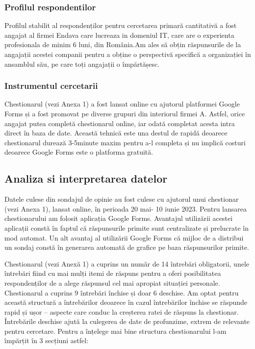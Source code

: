 \documentclass[a4paper, 12pt]{article}
\begin{document}
		\subsubsection{Profilul respondentilor}
	\quad Profilul stabilit al respondenților pentru cercetarea primară cantitativă a fost angajat al firmei Endava care lucreaza in domeniul IT, care are  o experienta profesionala de minim 6 luni, din România.Am ales să obțin răspunsurile de la angajații acestei companii pentru a obține o perspectivă specifică a organizației în ansamblul său, pe care toți angajații o împărtășesc.
		
	\subsubsection{Instrumentul cercetarii}

	\quad Chestionarul (vezi Anexa 1) a fost lansat online cu ajutorul platformei Google Forms și a fost promovat  pe diverse grupuri din interiorul firmei A. Astfel, orice angajat putea completă chestionarul online, iar odată completat acesta intra direct în baza de date. Această tehnică este una destul de rapidă deoarece chestionarul durează 3-5minute maxim pentru a-l completa și nu implică costuri deoarece Google Forms este o platforma gratuită.

	\subsection{Analiza si interpretarea datelor}

	\quad Datele culese din sondajul de opinie au fost culese cu ajutorul unui chestionar (vezi Anexa 1), lansat online, în perioada 20 mai- 10 iunie 2023. Pentru lansarea chestionarului am folosit aplicația Google Forms. Avantajul utilizării acestei aplicații constă în faptul că răspunsurile primite sunt centralizate și prelucrate în mod automat. Un alt avantaj al utilizării Google Forms că mijloc de a distribui un sondaj constă în generarea automată de grafice pe baza răspunsurilor primite. 	

	\quad Chestionarul (vezi Anexă 1) a cuprins un număr de 14 întrebări obligatorii, unele întrebări fiind cu mai mulți itemi de răspuns pentru a oferi posibilitatea respondenților de a alege răspunsul cel mai apropiat situației personale. Chestionarul a cuprins 9 întrebări închise și doar 6 deschise. Am optat pentru această structură a întrebărilor deoarece în cazul întrebărilor închise se răspunde rapid și ușor – aspecte care conduc la creșterea ratei de răspuns la chestionar. Întrebările deschise  ajută la culegerea de date de profunzime, extrem de relevante pentru cercetare.  Pentru a înțelege mai bine structura chestionarului l-am împărțit în 3 secțiuni astfel:
\end{document}

